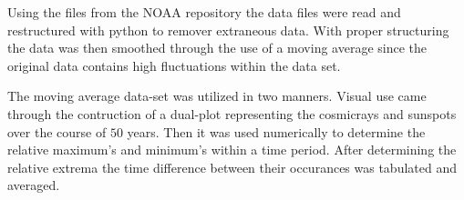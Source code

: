 \par Using the files from the NOAA repository the data files were read and 
restructured with python to remover extraneous data. With proper structuring
the data was then smoothed through the use of a moving average since the 
original data contains high fluctuations within the data set.\\
\par The moving average data-set was utilized in two manners. 
Visual use came through the contruction of a dual-plot representing
the cosmicrays and sunspots over the course of $50$ years. Then it was used
numerically to determine the relative maximum's and minimum's within a time
period. After determining the relative extrema the time difference between
their occurances was tabulated and averaged. 
